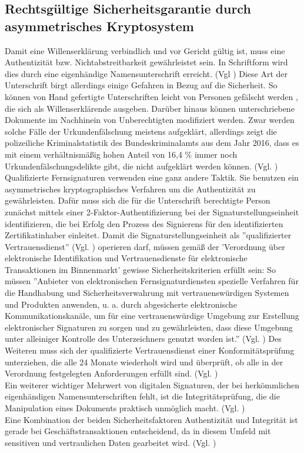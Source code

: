 \documentclass[deutsch]{lib/llncs/llncs}
\begin{document}
\subsection{Rechtsgültige Sicherheitsgarantie durch asymmetrisches Kryptosystem}
Damit eine Willenserklärung verbindlich und vor Gericht gültig ist, muss eine Authentizität bzw. Nichtabstreitbarkeit gewährleistet sein. In Schriftform wird dies durch eine eigenhändige Namensunterschrift erreicht. (Vgl \cite[S. 5-6]{gruhn2007elektronische}) Diese Art der Unterschrift birgt allerdings einige Gefahren in Bezug auf die Sicherheit. So können von Hand gefertigte Unterschriften leicht von Personen gefälscht werden , die sich als Willenserklärende ausgeben. Darüber hinaus können unterschriebene Dokumente im Nachhinein von Unberechtigten modifiziert werden. Zwar werden solche Fälle der Urkundenfälschung meistens aufgeklärt, allerdings zeigt die polizeiliche Kriminalstatistik des Bundeskriminalamts aus dem Jahr 2016, dass es mit einem verhältnismäßig hohen Anteil von 16,4 \% immer noch Urkundenfälschungsdelikte gibt, die nicht aufgeklärt werden können. (Vgl. \cite[S. 34]{bindeskriminalamt2017polizeiliche})\\
Qualifizierte Fernsignaturen verwenden eine ganz andere Taktik. Sie benutzen ein asymmetrisches kryptographisches Verfahren um die Authentizität zu gewährleisten. Dafür muss sich die für die Unterschrift berechtigte Person zunächst mittels einer 2-Faktor-Authentifizierung bei der Signaturstellungseinheit identifizieren, die bei Erfolg den Prozess des Signierens für den identifizierten Zertifikatinhaber einleitet. Damit die Signaturstellungseinheit als ''qualifizierter Vertrauensdienst'' (Vgl. \cite[S. 30]{schmeh2017neue}) operieren darf, müssen gemäß der 'Verordnung über elektronische Identifikation und Vertrauensdienste für elektronische Transaktionen im Binnenmarkt' gewisse Sicherheitskriterien erfüllt sein: So müssen ''Anbieter von elektronischen Fernsignaturdiensten spezielle Verfahren für die Handhabung und Sicherheitsverwahrung mit vertrauenswürdigen Systemen und Produkten anwenden, u. a. durch abgesicherte elektronische Kommunikationskanäle, um für eine vertrauenswürdige Umgebung zur Erstellung elektronischer Signaturen zu sorgen und zu gewährleisten, dass diese Umgebung unter alleiniger Kontrolle des Unterzeichners genutzt worden ist.'' (Vgl. \cite[S. 233]{entschew2016neue}) Des Weiteren muss sich der qualifizierte Vertrauensdienst einer Konformitätsprüfung unterziehen, die alle 24 Monate wiederholt wird und überprüft, ob alle in der Verordnung festgelegten Anforderungen erfüllt sind. (Vgl. \cite[S. 30]{schmeh2017neue}) \\
Ein weiterer wichtiger Mehrwert von digitalen Signaturen, der bei herkömmlichen eigenhändigen Namensunterschriften fehlt, ist die Integritätsprüfung, die die Manipulation eines Dokuments praktisch unmöglich macht. (Vgl. \cite[S. 7]{arthurdlittle2015digitale}) \\
Eine Kombination der beiden Sicherheitsfaktoren Authentizität und Integrität ist gerade bei Geschäftstransaktionen entscheidend, da in diesem Umfeld mit sensitiven und vertraulichen Daten gearbeitet wird. (Vgl. \cite[S. 7]{arthurdlittle2015digitale})
\end{document}
